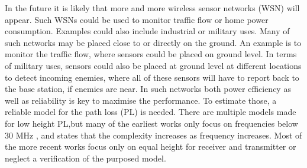 
In the future it is likely that more and more wireless sensor networks (WSN) will appear. Such WSNs could be used to monitor traffic flow or home power consumption. Examples could also include industrial or military uses. Many of such networks may be placed close to or directly on the ground. An example is to monitor the traffic flow, where sensors could be placed on ground level. In terms of military uses, sensors could also be placed at ground level at different locations to detect incoming enemies, where all of these sensors will have to report back to the base station, if enemies are near. In such networks both power efficiency as well as reliability is key to maximise the performance. To estimate those, a reliable model for the path loss (PL) is needed.
There are multiple models made for low height PL,but many of the earliest works only focus on frequencies below 30 MHz \cite{Bullington}, and states that the complexity increases as frequency increases. Most of the more recent works focus only on equal height for receiver and transmitter or neglect a verification of the purposed model. 


